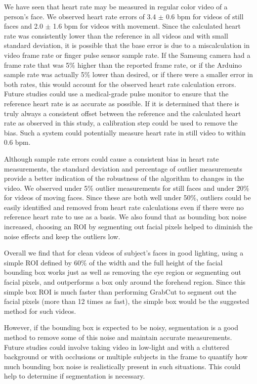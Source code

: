 \documentclass[10pt,twocolumn,letterpaper]{article}
\begin{document}
We have seen that heart rate may be measured in regular color video of a person's face. We observed heart rate errors of 3.4 $\pm$ 0.6 bpm for videos of still faces and 2.0 $\pm$ 1.6 bpm for videos with movement. Since the calculated heart rate was consistently lower than the reference in all videos and with small standard deviation, it is possible that the base error is due to a miscalculation in video frame rate or finger pulse sensor sample rate. If the Samsung camera had a frame rate that was 5\% higher than the reported frame rate, or if the Arduino sample rate was actually 5\% lower than desired, or if there were a smaller error in both rates, this would account for the observed heart rate calculation errors. Future studies could use a medical-grade pulse monitor to ensure that the reference heart rate is as accurate as possible. If it is determined that there is truly always a consistent offset between the reference and the calculated heart rate as observed in this study, a calibration step could be used to remove the bias. Such a system could potentially measure heart rate in still video to within 0.6 bpm. 

Although sample rate errors could cause a consistent bias in heart rate measurements, the standard deviation and percentage of outlier measurements provide a better indication of the robustness of the algorithm to changes in the video. We observed under 5\% outlier measurements for still faces and under 20\% for videos of moving faces. Since these are both well under 50\%, outliers could be easily identified and removed from heart rate calculations even if there were no reference heart rate to use as a basis. We also found that as bounding box noise increased, choosing an ROI by segmenting out facial pixels helped to diminish the noise effects and keep the outliers low.

Overall we find that for clean videos of subject's faces in good lighting, using a simple ROI defined by 60\% of the width and the full height of the facial bounding box works just as well as removing the eye region or segmenting out facial pixels, and outperforms a box only around the forehead region. Since this simple box ROI is much faster than performing GrabCut to segment out the facial pixels (more than 12 times as fast), the simple box would be the suggested method for such videos.

However, if the bounding box is expected to be noisy, segmentation is a good method to remove some of this noise and maintain accurate measurements. Future studies could involve taking video in low-light and with a cluttered background or with occlusions or multiple subjects in the frame to quantify how much bounding box noise is realistically present in such situations. This could help to determine if segmentation is necessary.
\end{document}
